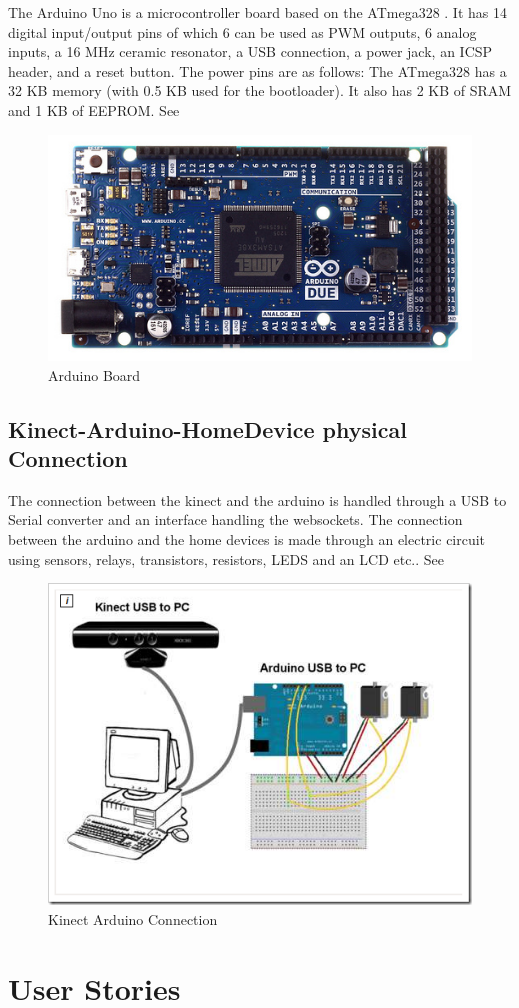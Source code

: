 The Arduino Uno is a microcontroller board based on the ATmega328 . It has 14 digital input/output pins of which 6 can be used as PWM outputs, 6 analog inputs, a 16 MHz ceramic resonator, a USB connection, a power jack, an ICSP header, and a reset button.
The power pins are as follows:
The ATmega328 has a 32 KB memory (with 0.5 KB used for the bootloader). It also has 2 KB of SRAM and 1 KB of EEPROM.
See 
\begin{figure}[ptbh]
  \centering
  \includegraphics[width=0.5\linewidth]{ArduinoUNOBoard}
  \caption{Arduino Board }
  \label{fig:arduinoboard}
\end{figure}

\subsection{Kinect-Arduino-HomeDevice physical Connection}

The connection between the kinect and the arduino is handled through a USB to Serial converter and an interface handling the websockets.
The connection between the arduino and the home devices is made through an electric circuit using sensors, relays, transistors, resistors, LEDS and an LCD etc..
See 
\begin{figure}[bp]
  \centering
  \includegraphics[width=0.5\linewidth]{Kinect-Arduino-Connection}
  \caption{Kinect Arduino Connection}
  \label{fig:kinectarduinoconnection}
\end{figure}

\section{User Stories}

